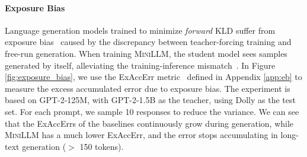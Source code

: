 \documentclass{article}
\begin{document}
\paragraph{Exposure Bias}


Language generation models trained to minimize \textit{forward} KLD suffer from exposure bias~\citep{exposure_bias} caused by the discrepancy between teacher-forcing training and free-run generation. When training \textsc{MiniLLM}, the student model sees samples generated by itself, alleviating the training-inference mismatch~\citep{cold}. In Figure \ref{fig:exposure_bias}, we use the ExAccErr metric~\citep{eb_measure} defined in Appendix \ref{app:eb} to measure the excess accumulated error due to exposure bias. The experiment is based on GPT-2-125M, with GPT-2-1.5B as the teacher, using Dolly as the test set. For each prompt, we sample 10 responses to reduce the variance. We can see that the ExAccErrs of the baselines continuously grow during generation, while \textsc{MiniLLM} has a much lower ExAccErr, and the error stops accumulating in long-text generation ($>$ 150 tokens). 
\end{document}
